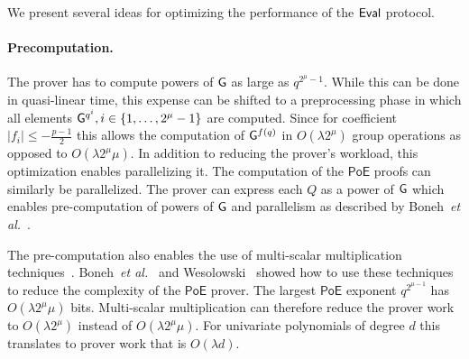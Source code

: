 We present several ideas for optimizing the performance of the $\textsf{{Eval}}$ protocol.

\paragraph{Precomputation.} The prover has to compute powers of $\gr{g}$ as large as $q^{2^{\mu}-1}$. While this can be done in quasi-linear time, this expense can be shifted to a preprocessing phase in which all elements $\gr{g}^{q^i}, i \in \{1, \ldots, 2^{\mu}-1\}$ are computed. Since for coefficient $|f_i|\leq -\frac{p-1}{2}$ this allows the computation of $\gr{g}^{f(q)}$ in $O(\lambda 2^\mu)$ group operations as opposed to $O(\lambda 2^\mu \mu)$.
In addition to reducing the prover's workload, this optimization enables parallelizing it. The computation of the $\textsf{PoE}$ proofs can similarly be parallelized. The prover can express each $Q$ as a power of $\gr{g}$ which enables pre-computation of powers of $\gr{g}$ and parallelism as described by Boneh~\emph{et al.}~\cite{C:BonBunFis19}.

The pre-computation also enables the use of multi-scalar multiplication techniques~\cite{pippenger1980evaluation}. Boneh~\emph{et al.}~\cite{C:BonBunFis19} and Wesolowski~\cite{EC:Wesolowski19} showed how to use these techniques to reduce the complexity of the $\textsf{PoE}$ prover. The largest $\textsf{PoE}$ exponent $q^{2^{\mu-1}}$ has $O(\lambda 2^{\mu} \mu)$ bits. Multi-scalar multiplication can therefore reduce the prover work to $O(\lambda 2^{\mu})$ instead of $O(\lambda 2^{\mu} \mu)$. For univariate polynomials of degree $d$ this translates to prover work that is $O(\lambda d)$. 


